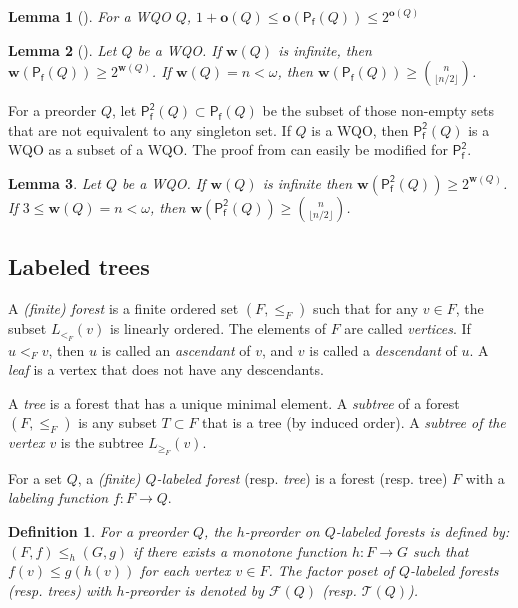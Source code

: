 \documentclass[10pt,a4paper]{amsart}
\let \leq \leqslant
\let \geq \geqslant
\renewcommand \S [1][]{\mathsf{P_f^{#1}}}
\def \T {\mathcal{T}}
\def \F {\mathcal{F}}
\def \o {\textbf{o}}
\def \w {\textbf{w}}
\newtheorem{lemma}{Lemma}
\newtheorem{definition}{Definition}
\begin{document}
\begin{lemma}[{\cite[theorem 3.3]{Abriola2023}}]\label{o(S)}
    For a WQO $Q$, $1+\o(Q) \leq \o(\S(Q)) \leq 2^{\o(Q)}$
\end{lemma}

\begin{lemma}[{\cite[theorem 3.11]{Abriola2023}}]\label{w(S)}
    Let $Q$ be a WQO. If $\w(Q)$ is infinite, then $\w(\S(Q)) \geq 2^{\w(Q)}$. If $\w(Q) = n < \omega$, then $\w(\S(Q)) \geq \binom{n}{\lfloor n/2 \rfloor}$.
\end{lemma}

For a preorder $Q$, let $\S[2](Q) \subset \S(Q)$ be the subset of those non-empty sets that are not equivalent to any singleton set. If $Q$ is a WQO, then $\S[2](Q)$ is a WQO as a subset of a WQO. The proof from \cite[theorem 3.11]{Abriola2023} can easily be modified for $\S[2]$.

\begin{lemma}\label{w(S2)}
    Let $Q$ be a WQO. If $\w(Q)$ is infinite then $\w(\S[2](Q)) \geq 2^{\w(Q)}$. If $3 \leq \w(Q) = n < \omega$, then $\w(\S[2](Q)) \geq \binom{n}{\lfloor n/2 \rfloor}$.
\end{lemma}

\subsection{Labeled trees}\label{trees}

A \textit{(finite) forest} is a finite ordered set $(F, \leq_F)$ such that for any $v \in F$, the subset $L_{<_F}(v)$ is linearly ordered. The elements of $F$ are called \textit{vertices}. If $u <_F v$, then $u$ is called an \textit{ascendant} of $v$, and $v$ is called a \textit{descendant} of $u$. A \textit{leaf} is a vertex that does not have any descendants.

A \textit{tree} is a forest that has a unique minimal element. A \textit{subtree} of a forest $(F, \leq_F)$ is any subset $T \subset F$ that is a tree (by induced order). A \textit{subtree of the vertex $v$} is the subtree $L_{\geq_F}(v)$.

For a set $Q$, a \textit{(finite) $Q$-labeled forest} (resp. \textit{tree}) is a forest (resp. tree) $F$ with a \textit{labeling function} $f \colon F \to Q$.

\begin{definition}
    For a preorder $Q$, the $h$-preorder on $Q$-labeled forests is defined by: $(F, f) \leq_h (G, g)$ if there exists a monotone function $h \colon F \to G$ such that $f(v) \leq g(h(v))$ for each vertex $v \in F$. The factor poset of $Q$-labeled forests (resp. trees) with $h$-preorder is denoted by $\F(Q)$ (resp. $\T(Q)$).
\end{definition}
\end{document}
